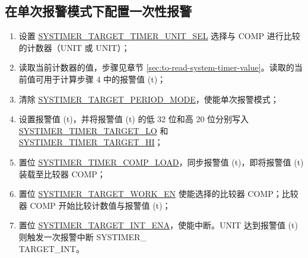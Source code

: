 \documentclass[main\_\_CN.tex]{subfiles}
\begin{document}
\subsection{在单次报警模式下配置一次性报警}
\begin{enumerate}
    \item 设置 \hyperref[fielddesc:SYSTIMERTARGET0TIMERUNITSEL]{SYSTIMER\_TARGET\_TIMER\_UNIT\_SEL} 选择与 COMP 进行比较的计数器（UNIT 或 UNIT）；
    \item 读取当前计数器的值，步骤见章节  \ref{sec:to-read-system-timer-value}。读取的当前值可用于计算步骤 4 中的报警值 (t)；
    \item 清除 \hyperref[fielddesc:SYSTIMERTARGET0PERIODMODE]{SYSTIMER\_TARGET\_PERIOD\_MODE}，使能单次报警模式；
    \item 设置报警值 (t)，并将报警值 (t) 的低 32 位和高 20 位分别写入   \hyperref[fielddesc:SYSTIMERTIMERTARGET0LO]{SYSTIMER\_TIMER\_TARGET\_LO} 和 \hyperref[fielddesc:SYSTIMERTIMERTARGET0HI]{SYSTIMER\_TIMER\_TARGET\_HI}；
    \item 置位 \hyperref[fielddesc:SYSTIMERTIMERCOMP0LOAD]{SYSTIMER\_TIMER\_COMP\_LOAD}，同步报警值 (t)，即将报警值 (t) 装载至比较器 COMP；
    \item 置位 \hyperref[fielddesc:SYSTIMERTARGET0WORKEN]{SYSTIMER\_TARGET\_WORK\_EN} 使能选择的比较器 COMP；比较器 COMP\regindex{} 开始比较计数值与报警值 (t)；
    \item 置位 \hyperref[fielddesc:SYSTIMERTARGET0INTENA]{SYSTIMER\_TARGET\_INT\_ENA}，使能中断。UNIT 达到报警值 (t) 则触发一次报警中断 SYSTIMER\_\\TARGET{}\_INT。
\end{enumerate}
\end{document}
